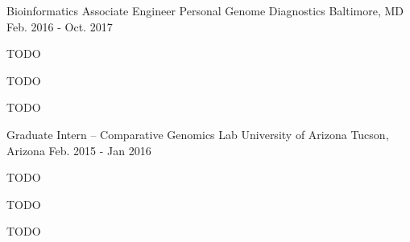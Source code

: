 \begin{cventries}
  \cventry
    {Bioinformatics Associate Engineer} %
    {Personal Genome Diagnostics} %
    {Baltimore, MD} %
    {Feb. 2016 - Oct. 2017} %
    {
      \begin{cvitems} %
        \item{TODO}
        \item{TODO}
        \item{TODO}
      \end{cvitems}
    }
  \cventry
    {Graduate Intern – Comparative Genomics Lab} %
    {University of Arizona} %
    {Tucson, Arizona} %
    {Feb. 2015 - Jan 2016} %
    {
      \begin{cvitems} %
        \item{TODO}
        \item{TODO}
        \item{TODO}
      \end{cvitems}
    }
\end{cventries}
